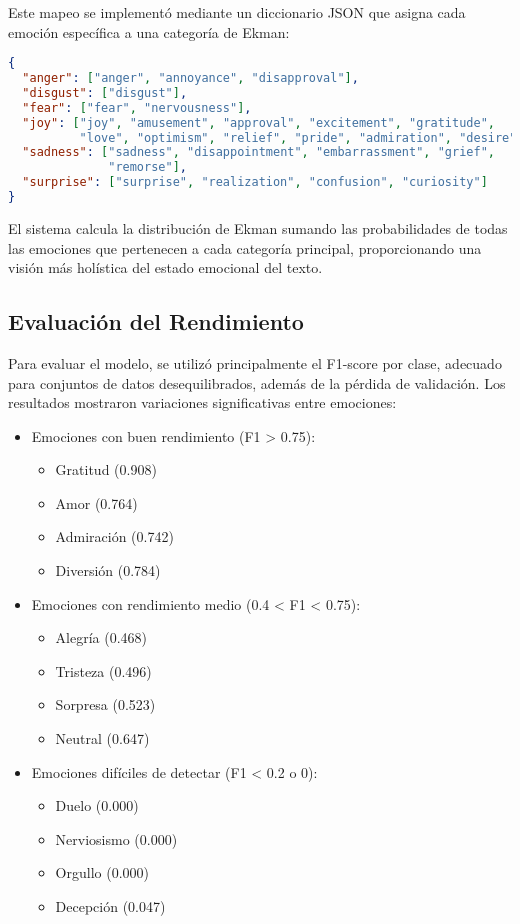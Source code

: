 \documentclass[12pt,a4paper]{report}
\begin{document}
Este mapeo se implementó mediante un diccionario JSON que asigna cada emoción específica a una categoría de Ekman:

\begin{lstlisting}[language=JSON]
{
  "anger": ["anger", "annoyance", "disapproval"],
  "disgust": ["disgust"],
  "fear": ["fear", "nervousness"],
  "joy": ["joy", "amusement", "approval", "excitement", "gratitude", 
          "love", "optimism", "relief", "pride", "admiration", "desire", "caring"],
  "sadness": ["sadness", "disappointment", "embarrassment", "grief", 
              "remorse"],
  "surprise": ["surprise", "realization", "confusion", "curiosity"]
}
\end{lstlisting}

El sistema calcula la distribución de Ekman sumando las probabilidades de todas las emociones que pertenecen a cada categoría principal, proporcionando una visión más holística del estado emocional del texto.

\subsection{Evaluación del Rendimiento}

Para evaluar el modelo, se utilizó principalmente el F1-score por clase, adecuado para conjuntos de datos desequilibrados, además de la pérdida de validación. Los resultados mostraron variaciones significativas entre emociones:

\begin{itemize}
  \item Emociones con buen rendimiento (F1 > 0.75):
  \begin{itemize}
    \item Gratitud (0.908)
    \item Amor (0.764)
    \item Admiración (0.742)
    \item Diversión (0.784)
  \end{itemize}
  
  \item Emociones con rendimiento medio (0.4 < F1 < 0.75):
  \begin{itemize}
    \item Alegría (0.468)
    \item Tristeza (0.496)
    \item Sorpresa (0.523)
    \item Neutral (0.647)
  \end{itemize}
  
  \item Emociones difíciles de detectar (F1 < 0.2 o 0):
  \begin{itemize}
    \item Duelo (0.000)
    \item Nerviosismo (0.000)
    \item Orgullo (0.000)
    \item Decepción (0.047)
  \end{itemize}
\end{itemize}
\end{document}

